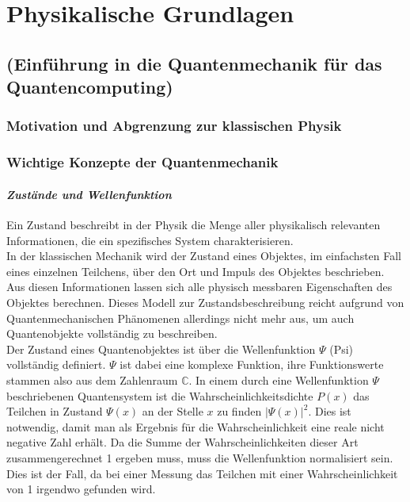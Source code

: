 \chapter{Physikalische Grundlagen}
\label{physics} %



\section{(Einführung in die Quantenmechanik für das Quantencomputing)}
\subsection{Motivation und Abgrenzung zur klassischen Physik }
\subsection{Wichtige Konzepte der Quantenmechanik }
\subsubsection{\textit{\textit{Zustände und Wellenfunktion} }}

Ein Zustand beschreibt in der Physik die Menge aller physikalisch relevanten Informationen, die ein spezifisches System charakterisieren.\\

In der klassischen Mechanik wird der Zustand eines Objektes, im einfachsten Fall eines einzelnen Teilchens, über den Ort und Impuls des Objektes beschrieben. Aus diesen Informationen lassen sich alle physisch messbaren Eigenschaften des Objektes berechnen. Dieses Modell zur Zustandsbeschreibung reicht aufgrund von Quantenmechanischen Phänomenen allerdings nicht mehr aus, um auch Quantenobjekte vollständig zu beschreiben.\\

Der Zustand eines Quantenobjektes ist über die Wellenfunktion $\Psi$ (Psi) vollständig definiert. $\Psi$ ist dabei eine komplexe Funktion, ihre Funktionswerte stammen also aus dem Zahlenraum $\mathbb{C}$. In einem durch eine Wellenfunktion $\Psi$ beschriebenen Quantensystem ist die Wahrscheinlichkeitsdichte $P(x)$ das Teilchen in Zustand $\Psi(x)$ an der Stelle $x$ zu finden $|\Psi(x)|^2$. Dies ist notwendig, damit man als Ergebnis für die Wahrscheinlichkeit eine reale nicht negative Zahl erhält. Da die Summe der Wahrscheinlichkeiten dieser Art zusammengerechnet 1 ergeben muss, muss die Wellenfunktion normalisiert sein. Dies ist der Fall, da bei einer Messung das Teilchen mit einer Wahrscheinlichkeit von 1 irgendwo gefunden wird.

